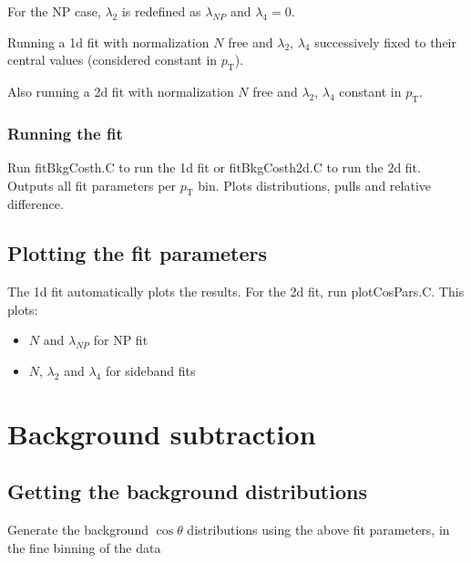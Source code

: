 \documentclass{article}
\newcommand{\pt}{p_\text{T}}
\newcommand{\cost}{\cos\theta}
\begin{document}
For the NP case, $\lambda_2$ is redefined as $\lambda_{NP}$ and $\lambda_4=0$.

Running a 1d fit with normalization $N$ free and $\lambda_2$, $\lambda_4$ successively fixed to their central values (considered constant in $\pt$).

Also running a 2d fit with normalization $N$ free and $\lambda_2$, $\lambda_4$ constant in $\pt$.

\subsubsection{Running the fit}

Run fitBkgCosth.C to run the 1d fit or fitBkgCosth2d.C to run the 2d fit. Outputs all fit parameters per $\pt$ bin. Plots distributions, pulls and relative difference.

\subsection{Plotting the fit parameters}

The 1d fit automatically plots the results. For the 2d fit, run plotCosPars.C. This plots:
\begin{itemize}
\item $N$ and $\lambda_{NP}$ for NP fit
\item $N$, $\lambda_2$ and $\lambda_4$ for sideband fits
\end{itemize}

\pagebreak

\section{Background subtraction}

\subsection{Getting the background distributions}

Generate the background $\cost$ distributions using the above fit parameters, in the fine binning of the data
\end{document}
